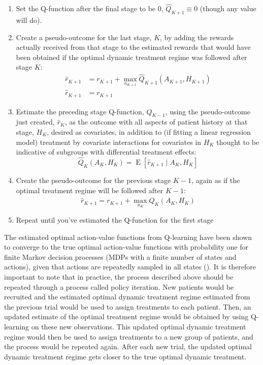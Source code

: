 \documentclass[12pt]{article}
\begin{document}
\begin{enumerate}
  \item Set the Q-function after the final stage to be 0, $\hat{Q}_{K+1} \equiv 0$ (though any value will do).
  \item Create a pseudo-outcome for the last stage, $K$, by adding the rewards actually received from that stage to the estimated rewards that would have been obtained if the optimal dynamic treatment regime was followed after stage $K$:
  \begin{align}
    \hat{r}_{K+1} &= r_{K+1} + \max_{a_{K+1}} \hat{Q}_{K+1}(A_{K+1}, H_{K+1}) \\
    \hat{r}_{K+1} &= r_{K+1}
  \end{align}
  \item Estimate the preceding stage Q-function, $Q_{K - 1}$, using the pseudo-outcome just created, $\hat{r}_{K}$, as the outcome with all aspects of patient history at that stage, $H_{K}$, desired as covariates, in addition to (if fitting a linear regression model) treatment by covariate interactions for covariates in $H_{K}$ thought to be indicative of subgroups with differential treatment effects:
  \begin{equation}
      \hat{Q}_{K}(A_{K}, H_{K}) = \operatorname{E}[\hat{r}_{K+1} \mid A_{K}, H_{K}]
  \end{equation}
  \item Create the pseudo-outcome for the previous stage $K - 1$, again as if the optimal treatment regime will be followed after $K - 1$:
  \begin{equation}
    \hat{r}_{K+1} = r_{K+1} + \max_{a_K} \hat{Q}_{K}(A_{K}, H_{K})
  \end{equation}
  \item Repeat until you've estimated the Q-function for the first stage
\end{enumerate}



The estimated optimal action-value functions from Q-learning have been shown to converge to the true optimal action-value functions with probability one for finite Markov decision processes (MDPs with a finite number of states and actions), given that actions are repeatedly sampled in all states (\cite{Watkins1992}). It is therefore important to note that in practice, the process described above should be repeated through a process called policy iteration. New patients would be recruited and the estimated optimal dynamic treatment regime estimated from the previous trial would be used to assign treatments to each patient. Then, an updated estimate of the optimal treatment regime would be obtained by using Q-learning on these new observations. This updated optimal dynamic treatment regime would then be used to assign treatments to a new group of patients, and the process would be repeated again. After each new trial, the updated optimal dynamic treatment regime gets closer to the true optimal dynamic treatment. 
\end{document}
